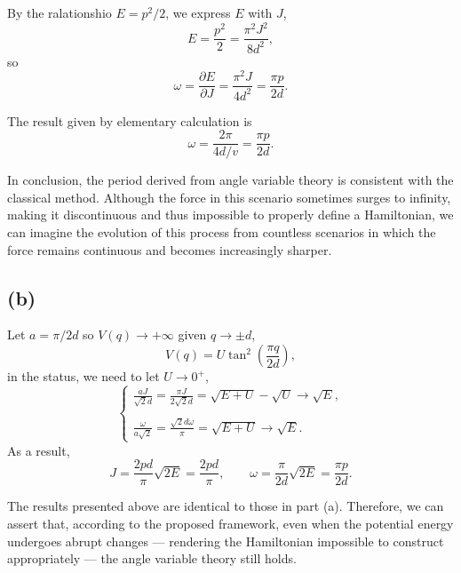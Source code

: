         By the ralationshio $E=p^2/2$, we express $E$ with $J$,
        \begin{equation}
            E = \frac{p^2}{2} =\frac{\pi^2 J^2}{8d^2},
        \end{equation}
        so
        $$
        \omega = \frac{\partial E}{\partial J} = \frac{\pi^2J}{4d^2} = \frac{\pi p}{2d}.
        $$

        The result given by elementary calculation is
        $$
        \omega = \frac{2\pi}{4d/v} = \frac{\pi p}{2d}.
        $$

        In conclusion, the period derived from angle variable theory is consistent with the classical method. Although the force in this scenario sometimes surges to infinity, making it discontinuous and thus impossible to properly define a Hamiltonian, we can imagine the evolution of this process from countless scenarios in which the force remains continuous and becomes increasingly sharper.

    \subsection*{(b)}
        Let $a=\pi/2d$ so $V\left(q\right)\to+\infty$ given $q\to\pm d$,
        \begin{equation}
            V\left(q\right)=U\tan^2\left(\frac{\pi q}{2d}\right),
        \end{equation}
        in the status, we need to let $U\to 0^+$,
        \begin{equation}
            \begin{cases}
                \displaystyle\frac{aJ}{\sqrt{2}d} = \frac{\pi J}{2\sqrt{2}d}=\sqrt{E+U}-\sqrt{U} \to \sqrt{E},\\\\
                \displaystyle\frac{\omega}{a\sqrt{2}} = \frac{\sqrt{2}d\omega}{\pi} = \sqrt{E+U} \to \sqrt{E}.
            \end{cases}
        \end{equation}
        As a result,
        $$
        J = \frac{2pd}{\pi}\sqrt{2E} = \frac{2pd}{\pi},
        \qquad
        \omega = \frac{\pi}{2d}\sqrt{2E} = \frac{\pi p}{2d}.
        $$

        The results presented above are identical to those in part (a). Therefore, we can assert that, according to the proposed framework, even when the potential energy undergoes abrupt changes — rendering the Hamiltonian impossible to construct appropriately — the angle variable theory still holds.